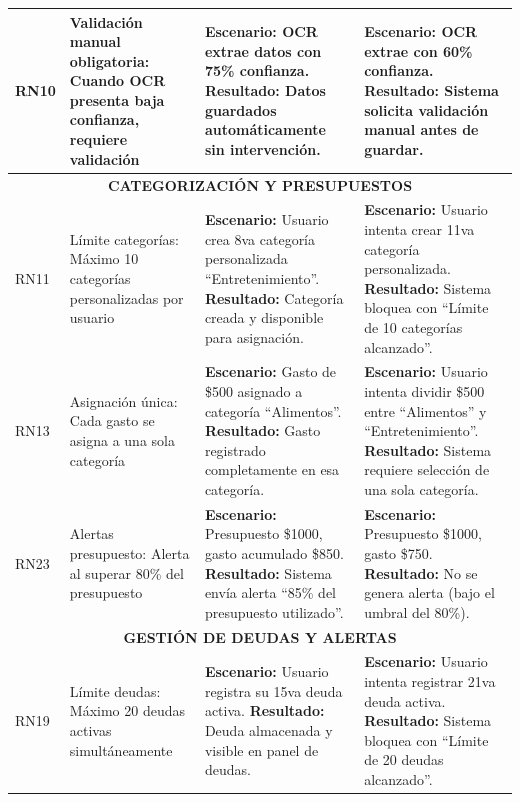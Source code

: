 \begin{table}[H]
\begin{tabular}{|p{1.2cm}|p{3.5cm}|p{4cm}|p{4cm}|}
RN10 & Validación manual obligatoria: Cuando OCR presenta baja confianza, requiere validación & 
\textbf{Escenario:} OCR extrae datos con 75\% confianza. \newline
\textbf{Resultado:} Datos guardados automáticamente sin intervención. &
\textbf{Escenario:} OCR extrae con 60\% confianza. \newline
\textbf{Resultado:} Sistema solicita validación manual antes de guardar. \\
\hline

\hline
\multicolumn{4}{|c|}{\textbf{CATEGORIZACIÓN Y PRESUPUESTOS}} \\
\hline

RN11 & Límite categorías: Máximo 10 categorías personalizadas por usuario & 
\textbf{Escenario:} Usuario crea 8va categoría personalizada ``Entretenimiento''. \newline
\textbf{Resultado:} Categoría creada y disponible para asignación. &
\textbf{Escenario:} Usuario intenta crear 11va categoría personalizada. \newline
\textbf{Resultado:} Sistema bloquea con ``Límite de 10 categorías alcanzado''. \\
\hline

RN13 & Asignación única: Cada gasto se asigna a una sola categoría & 
\textbf{Escenario:} Gasto de \$500 asignado a categoría ``Alimentos''. \newline
\textbf{Resultado:} Gasto registrado completamente en esa categoría. &
\textbf{Escenario:} Usuario intenta dividir \$500 entre ``Alimentos'' y ``Entretenimiento''. \newline
\textbf{Resultado:} Sistema requiere selección de una sola categoría. \\
\hline

RN23 & Alertas presupuesto: Alerta al superar 80\% del presupuesto & 
\textbf{Escenario:} Presupuesto \$1000, gasto acumulado \$850. \newline
\textbf{Resultado:} Sistema envía alerta ``85\% del presupuesto utilizado''. &
\textbf{Escenario:} Presupuesto \$1000, gasto \$750. \newline
\textbf{Resultado:} No se genera alerta (bajo el umbral del 80\%). \\
\hline

\hline
\multicolumn{4}{|c|}{\textbf{GESTIÓN DE DEUDAS Y ALERTAS}} \\
\hline

RN19 & Límite deudas: Máximo 20 deudas activas simultáneamente & 
\textbf{Escenario:} Usuario registra su 15va deuda activa. \newline
\textbf{Resultado:} Deuda almacenada y visible en panel de deudas. &
\textbf{Escenario:} Usuario intenta registrar 21va deuda activa. \newline
\textbf{Resultado:} Sistema bloquea con ``Límite de 20 deudas alcanzado''. \\
\hline


\end{tabular}
\end{table}
